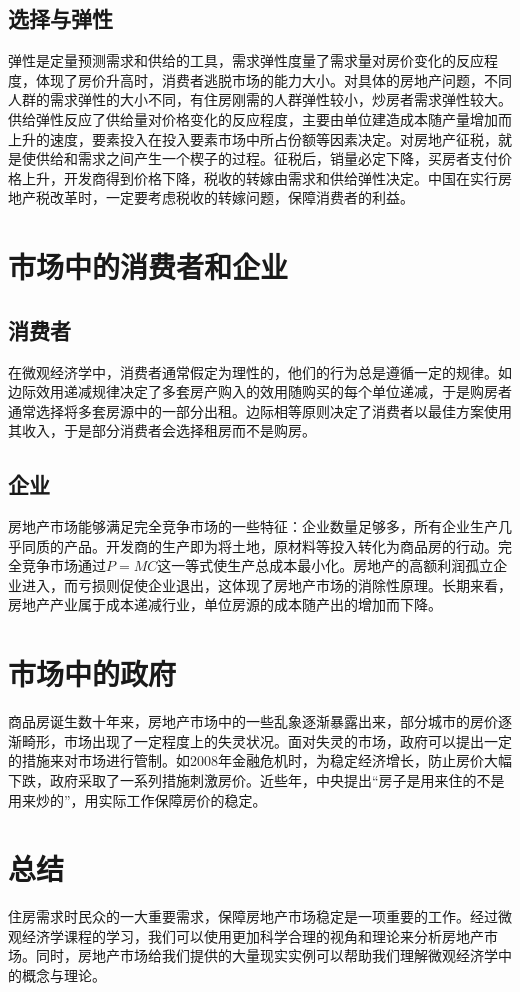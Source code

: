 \documentclass{ctexart}
\begin{document}
\subsection{选择与弹性}
弹性是定量预测需求和供给的工具，需求弹性度量了需求量对房价变化的反应程度，体现了房价升高时，消费者逃脱市场的能力大小。对具体的房地产问题，不同人群的需求弹性的大小不同，有住房刚需的人群弹性较小，炒房者需求弹性较大。供给弹性反应了供给量对价格变化的反应程度，主要由单位建造成本随产量增加而上升的速度，要素投入在投入要素市场中所占份额等因素决定。对房地产征税，就是使供给和需求之间产生一个楔子的过程。征税后，销量必定下降，买房者支付价格上升，开发商得到价格下降，税收的转嫁由需求和供给弹性决定。中国在实行房地产税改革时，一定要考虑税收的转嫁问题，保障消费者的利益。

\section{市场中的消费者和企业}
\subsection{消费者}
在微观经济学中，消费者通常假定为理性的，他们的行为总是遵循一定的规律。如边际效用递减规律决定了多套房产购入的效用随购买的每个单位递减，于是购房者通常选择将多套房源中的一部分出租。边际相等原则决定了消费者以最佳方案使用其收入，于是部分消费者会选择租房而不是购房。
\subsection{企业}
房地产市场能够满足完全竞争市场的一些特征：企业数量足够多，所有企业生产几乎同质的产品。开发商的生产即为将土地，原材料等投入转化为商品房的行动。完全竞争市场通过$P=MC$这一等式使生产总成本最小化。房地产的高额利润孤立企业进入，而亏损则促使企业退出，这体现了房地产市场的消除性原理。长期来看，房地产产业属于成本递减行业，单位房源的成本随产出的增加而下降。


\section{市场中的政府}
商品房诞生数十年来，房地产市场中的一些乱象逐渐暴露出来，部分城市的房价逐渐畸形，市场出现了一定程度上的失灵状况。面对失灵的市场，政府可以提出一定的措施来对市场进行管制。如2008年金融危机时，为稳定经济增长，防止房价大幅下跌，政府采取了一系列措施刺激房价。近些年，中央提出“房子是用来住的不是用来炒的”，用实际工作保障房价的稳定。
\section{总结}
住房需求时民众的一大重要需求，保障房地产市场稳定是一项重要的工作。经过微观经济学课程的学习，我们可以使用更加科学合理的视角和理论来分析房地产市场。同时，房地产市场给我们提供的大量现实实例可以帮助我们理解微观经济学中的概念与理论。
\end{document}
